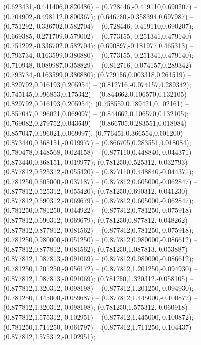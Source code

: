  (0.623431,-0.441406,0.820486) -- (0.728446,-0.419110,0.690207) -- (0.704902,-0.498112,0.800367);
 (0.646780,-0.358394,0.697987) -- (0.751292,-0.336702,0.582704) -- (0.728446,-0.419110,0.690207);
 (0.669385,-0.271709,0.579002) -- (0.773155,-0.251341,0.479140) -- (0.751292,-0.336702,0.582704);
 (0.690897,-0.181977,0.465313) -- (0.793734,-0.163599,0.380880) -- (0.773155,-0.251341,0.479140);
 (0.710948,-0.089987,0.358829) -- (0.812716,-0.074157,0.289342) -- (0.793734,-0.163599,0.380880);
 (0.729156,0.003318,0.261519) -- (0.829792,0.016193,0.205954) -- (0.812716,-0.074157,0.289342);
 (0.745145,0.096853,0.175342) -- (0.844662,0.106570,0.132105) -- (0.829792,0.016193,0.205954);
 (0.758559,0.189421,0.102161) -- (0.857047,0.196021,0.069097) -- (0.844662,0.106570,0.132105);
 (0.769082,0.279752,0.043649) -- (0.866705,0.283551,0.018084) -- (0.857047,0.196021,0.069097);
 (0.776451,0.366554,0.001200) -- (0.873440,0.368151,-0.019977) -- (0.866705,0.283551,0.018084);
 (0.780478,0.448568,-0.024158) -- (0.877110,0.448840,-0.044371) -- (0.873440,0.368151,-0.019977);
 (0.781250,0.525312,-0.032793) -- (0.877812,0.525312,-0.055420) -- (0.877110,0.448840,-0.044371);
 (0.781250,0.605000,-0.037187) -- (0.877812,0.605000,-0.062847) -- (0.877812,0.525312,-0.055420);
 (0.781250,0.690312,-0.041230) -- (0.877812,0.690312,-0.069679) -- (0.877812,0.605000,-0.062847);
 (0.781250,0.781250,-0.044922) -- (0.877812,0.781250,-0.075918) -- (0.877812,0.690312,-0.069679);
 (0.781250,0.877812,-0.048262) -- (0.877812,0.877812,-0.081562) -- (0.877812,0.781250,-0.075918);
 (0.781250,0.980000,-0.051250) -- (0.877812,0.980000,-0.086612) -- (0.877812,0.877812,-0.081562);
 (0.781250,1.087813,-0.053887) -- (0.877812,1.087813,-0.091069) -- (0.877812,0.980000,-0.086612);
 (0.781250,1.201250,-0.056172) -- (0.877812,1.201250,-0.094930) -- (0.877812,1.087813,-0.091069);
 (0.781250,1.320312,-0.058105) -- (0.877812,1.320312,-0.098198) -- (0.877812,1.201250,-0.094930);
 (0.781250,1.445000,-0.059687) -- (0.877812,1.445000,-0.100872) -- (0.877812,1.320312,-0.098198);
 (0.781250,1.575312,-0.060918) -- (0.877812,1.575312,-0.102951) -- (0.877812,1.445000,-0.100872);
 (0.781250,1.711250,-0.061797) -- (0.877812,1.711250,-0.104437) -- (0.877812,1.575312,-0.102951);

